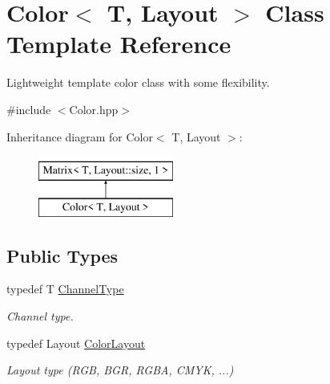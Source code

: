\hypertarget{class_d_o_1_1_color}{\section{Color$<$ T, Layout $>$ Class Template Reference}
\label{class_d_o_1_1_color}
}


Lightweight template color class with some flexibility.  




{\ttfamily \#include $<$Color.\-hpp$>$}

Inheritance diagram for Color$<$ T, Layout $>$\-:\begin{figure}[H]
\begin{center}
\leavevmode
\includegraphics[height=2.000000cm]{class_d_o_1_1_color}
\end{center}
\end{figure}
\subsection*{Public Types}
\begin{DoxyCompactItemize}
\item 
\hypertarget{class_d_o_1_1_color_a4fc05512d90a4b0e4d7a6ca6e56b9ed4}{typedef T \hyperlink{class_d_o_1_1_color_a4fc05512d90a4b0e4d7a6ca6e56b9ed4}{Channel\-Type}}\label{class_d_o_1_1_color_a4fc05512d90a4b0e4d7a6ca6e56b9ed4}

\begin{DoxyCompactList}\small\item\em Channel type. \end{DoxyCompactList}\item 
\hypertarget{class_d_o_1_1_color_a7a81d850ad8c8ac23245eabb7fae392b}{typedef Layout \hyperlink{class_d_o_1_1_color_a7a81d850ad8c8ac23245eabb7fae392b}{Color\-Layout}}\label{class_d_o_1_1_color_a7a81d850ad8c8ac23245eabb7fae392b}

\begin{DoxyCompactList}\small\item\em Layout type (R\-G\-B, B\-G\-R, R\-G\-B\-A, C\-M\-Y\-K, ...) \end{DoxyCompactList}\end{DoxyCompactItemize}

